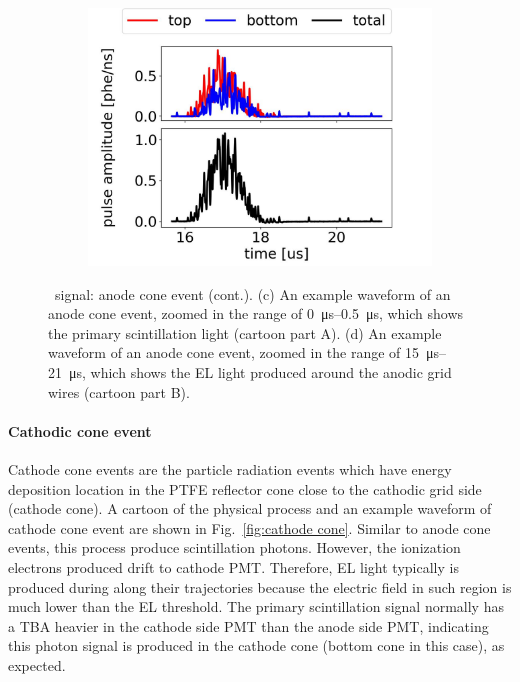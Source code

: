 \begin{figure}[!htbp]
\begin{subfigure}[b]{0.7\textwidth}
		\includegraphics[width=\figurewidth,clip,trim={0 0 0 0}]{Figures/GasTest/exampleWaveforms/proc64767AnodeCone1P2.jpg}
		\caption{}
		\label{fig:anode cone e}
	\end{subfigure}
	\caption[\gtest\ signal: anode cone event (cont.).]{\gtest\ signal: anode cone event (cont.). (c) An example waveform of an anode cone event, zoomed in the range of \SIrange{0}{0.5}{\us}, which shows the primary scintillation light (cartoon part A). (d) An example waveform of an anode cone event, zoomed in the range of \SIrange{15}{21}{\us}, which shows the EL light produced around the anodic grid wires (cartoon part B). }
	\label{fig:anode cone cont}
\end{figure}


\paragraph{Cathodic cone event}
\label{sec:events particle cathode cone}
Cathode cone events are the particle radiation events which have energy deposition location in the PTFE reflector cone close to the cathodic grid side (cathode cone). A cartoon of the physical process and an example waveform of cathode cone event are shown in Fig.~\ref{fig:cathode cone}. Similar to anode cone events, this process produce scintillation photons. However, the ionization electrons produced drift to cathode PMT. Therefore, EL light typically is produced during along their trajectories because the electric field in such region is much lower than the EL threshold. The primary scintillation signal normally has a TBA heavier in the cathode side PMT than the anode side PMT, indicating this photon signal is produced in the cathode cone (bottom cone in this case), as expected.

